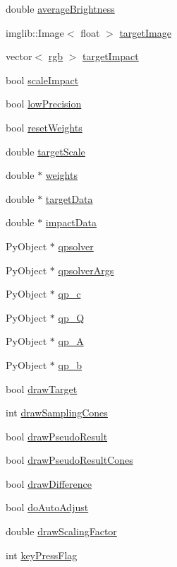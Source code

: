 \begin{DoxyCompactItemize}
double \hyperlink{classTransfer_a702cfe11b9ad9c7e0791babc21621245}{average\-Brightness}
\item 
imglib\-::\-Image$<$ float $>$ \hyperlink{classTransfer_a40b116d506ca8adf83b876a93f51eecc}{target\-Image}
\item 
vector$<$ \hyperlink{structrgb}{rgb} $>$ \hyperlink{classTransfer_ae36f78db5d40178eeb44d8d7147a253d}{target\-Impact}
\item 
bool \hyperlink{classTransfer_a85eeffaeab6bb9faa6315668d80ded1d}{scale\-Impact}
\item 
bool \hyperlink{classTransfer_a05d5140c8e56e40260d1170befc4fe32}{low\-Precision}
\item 
bool \hyperlink{classTransfer_a46b335fbbf977c6a8fc099e82fc8c8e8}{reset\-Weights}
\item 
double \hyperlink{classTransfer_ad07e0da48d24d6e13edf49a1b0aa42fb}{target\-Scale}
\item 
double $\ast$ \hyperlink{classTransfer_a6dde3d7a1918d18582bfd4e803187926}{weights}
\item 
double $\ast$ \hyperlink{classTransfer_ae7ff8bee691d2ffccfe2612fda8682d7}{target\-Data}
\item 
double $\ast$ \hyperlink{classTransfer_ab624db027ae5eeb4abc07b92fde760ab}{impact\-Data}
\item 
\-Py\-Object $\ast$ \hyperlink{classTransfer_aa863bc68b5b179fa64bee909fff1ebea}{qpsolver}
\item 
\-Py\-Object $\ast$ \hyperlink{classTransfer_a3de4ac3dd16f20a0f45909cafeeb3cda}{qpsolver\-Args}
\item 
\-Py\-Object $\ast$ \hyperlink{classTransfer_a8af2cc1ef014b8966e087528d323427c}{qp\-\_\-c}
\item 
\-Py\-Object $\ast$ \hyperlink{classTransfer_a09e2f76e2c47845ed59befd3615b7f20}{qp\-\_\-\-Q}
\item 
\-Py\-Object $\ast$ \hyperlink{classTransfer_a4d911da022865f47433fad766221ddc4}{qp\-\_\-\-A}
\item 
\-Py\-Object $\ast$ \hyperlink{classTransfer_a8baee9baa7d14b8139a666843c1cccee}{qp\-\_\-b}
\item 
bool \hyperlink{classTransfer_ab9c16a7ccd122f1e8ecb4afe73691013}{draw\-Target}
\item 
int \hyperlink{classTransfer_abe401aaa059449aaba2ecfc0ac630e19}{draw\-Sampling\-Cones}
\item 
bool \hyperlink{classTransfer_a9db40e99a69366e98ad8a40cd58a9af2}{draw\-Pseudo\-Result}
\item 
bool \hyperlink{classTransfer_a2bcd8af85816bfc3144438166f611257}{draw\-Pseudo\-Result\-Cones}
\item 
bool \hyperlink{classTransfer_a5fb22494a6010b45546ba4921454c90d}{draw\-Difference}
\item 
bool \hyperlink{classTransfer_ac654359f3c128d4283e276918b7ef4a8}{do\-Auto\-Adjust}
\item 
double \hyperlink{classTransfer_a271981a76dcfd0ce141413afef275c87}{draw\-Scaling\-Factor}
\item 
int \hyperlink{classTransfer_a47c627c055bbb8f170a9d59163522f21}{key\-Press\-Flag}
\end{DoxyCompactItemize}


